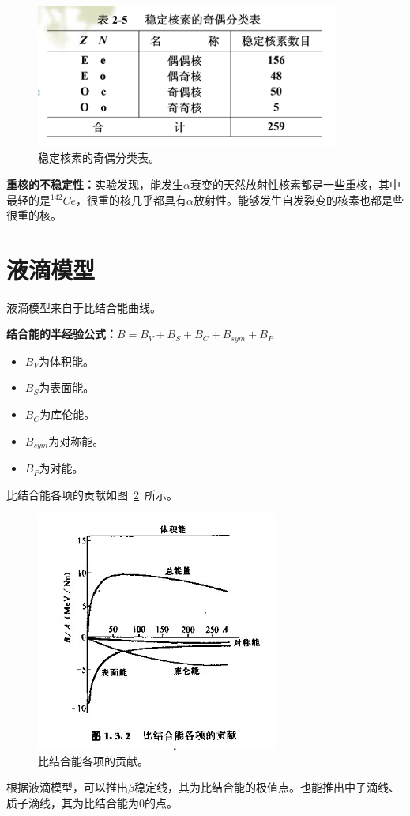 \begin{figure}[htbp]
    \centering
    \includegraphics[width=10cm]{figure//fig003.png}
    \caption{\label{fig003}稳定核素的奇偶分类表。}
\end{figure}

\textbf{重核的不稳定性：}实验发现，能发生$\alpha$衰变的天然放射性核素都是一些重核，其中最轻的是$^{142}Ce$，很重的核几乎都具有$\alpha$放射性。能够发生自发裂变的核素也都是些很重的核。

\section{液滴模型}

液滴模型来自于比结合能曲线。

\textbf{结合能的半经验公式：}$B=B_V + B_S + B_C + B_{sym} + B_P$

\begin{itemize}
    \item $B_V$为体积能。
    \item $B_S$为表面能。
    \item $B_C$为库伦能。
    \item $B_{sym}$为对称能。
    \item $B_P$为对能。
\end{itemize}

比结合能各项的贡献如图~\ref{fig004}~所示。

\begin{figure}[htbp]
    \centering
    \includegraphics[width=8cm]{figure//fig004.png}
    \caption{\label{fig004}比结合能各项的贡献。}
\end{figure}

根据液滴模型，可以推出$\beta$稳定线，其为比结合能的极值点。也能推出中子滴线、质子滴线，其为比结合能为0的点。